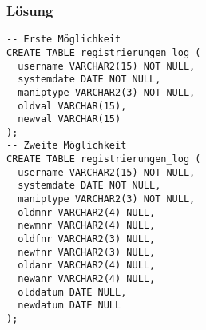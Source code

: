 \documentclass[a4paper,10pt,titlepage=false]{scrreprt}
\begin{document}
\subsubsection{Lösung}
\begin{lstlisting}[style=sql, title=Log-Tabelle]
-- Erste Möglichkeit
CREATE TABLE registrierungen_log (
  username VARCHAR2(15) NOT NULL,
  systemdate DATE NOT NULL,
  maniptype VARCHAR2(3) NOT NULL,
  oldval VARCHAR(15), 
  newval VARCHAR(15)
);
-- Zweite Möglichkeit
CREATE TABLE registrierungen_log (
  username VARCHAR2(15) NOT NULL,
  systemdate DATE NOT NULL,
  maniptype VARCHAR2(3) NOT NULL,
  oldmnr VARCHAR2(4) NULL,
  newmnr VARCHAR2(4) NULL,
  oldfnr VARCHAR2(3) NULL,
  newfnr VARCHAR2(3) NULL,
  oldanr VARCHAR2(4) NULL,
  newanr VARCHAR2(4) NULL,
  olddatum DATE NULL,
  newdatum DATE NULL
);
\end{lstlisting}
\end{document}

